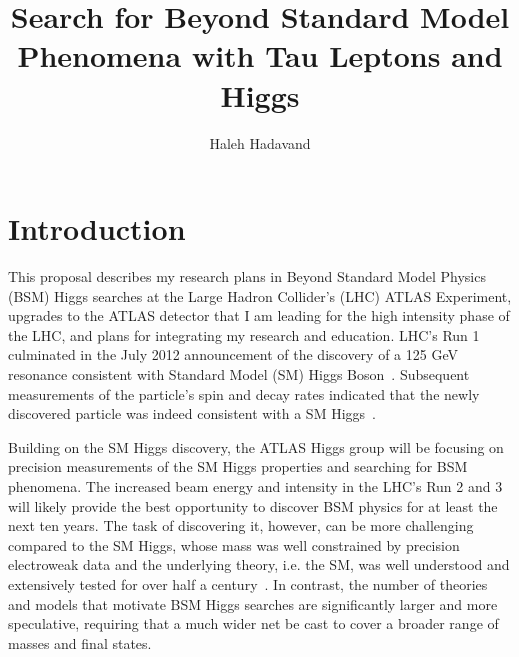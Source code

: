 \documentclass[11pt]{article}
\date{}
\title{Search for Beyond Standard Model Phenomena with Tau Leptons and Higgs}
\author{Haleh Hadavand}
\begin{document}
\maketitle
\section{Introduction}
This proposal describes my research plans in Beyond Standard Model Physics (BSM) Higgs searches at the Large Hadron Collider’s (LHC) ATLAS Experiment, upgrades to the ATLAS detector that I am leading for the high intensity phase of the LHC, 
and plans for integrating my research and education.
LHC's Run 1 culminated in the July 2012 announcement of the discovery of a 125 GeV resonance consistent with Standard Model (SM) Higgs Boson~\cite{atlhi, cmshi}. 
Subsequent measurements of the particle's spin and decay rates indicated that the newly discovered particle was indeed consistent with a SM Higgs~\cite{atlbo,atlsp,cmsf,cmsbo, cmspro}. 

Building on the SM Higgs discovery, the ATLAS Higgs group will be focusing on precision measurements of the SM Higgs properties and searching for BSM phenomena.
The increased beam energy and intensity in the LHC’s Run 2 and 3 will likely provide the best 
opportunity to discover BSM physics for at least the next ten years.
The task of discovering it, however, can be more challenging compared to the SM Higgs, whose mass was well constrained by precision electroweak data and the underlying theory, i.e. the SM, 
was well understood and extensively tested for over half a century~\cite{eng,higgs1,higgs2,higgs3}. 
In contrast, the number of theories and models that motivate BSM Higgs searches are significantly larger and more speculative, requiring that a much wider net be cast to cover a broader range of masses and final states. 
\end{document}
